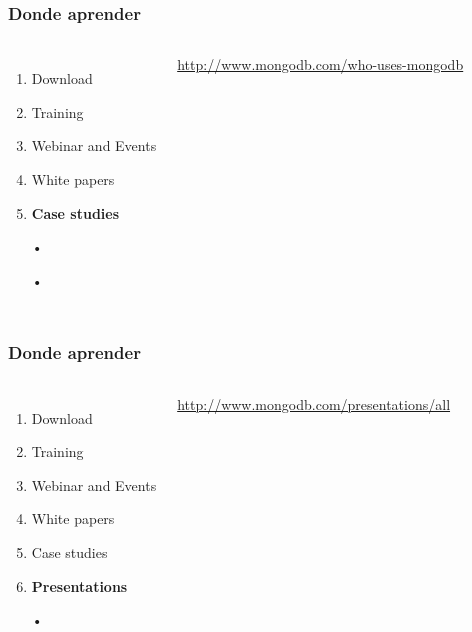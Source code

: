 \documentclass{beamer}
\begin{document}
\begin{frame}
\frametitle{Donde aprender}
\begin{columns}[c] %
\begin{enumerate}
\item Download
\item Training
\item Webinar and Events
\item White papers
\item \textbf{Case studies}
\item[•]
\item[•]
\end{enumerate}

{\color{blue}\url{http://www.mongodb.com/who-uses-mongodb}}
\end{columns}
\end{frame}
\begin{frame}
\frametitle{Donde aprender}
\begin{columns}[c] %
\begin{enumerate}
\item Download
\item Training
\item Webinar and Events
\item White papers
\item Case studies
\item \textbf{Presentations}
\item[•]
\end{enumerate}

{\color{blue}\url{http://www.mongodb.com/presentations/all}}
\end{columns}
\end{frame}
\end{document}

